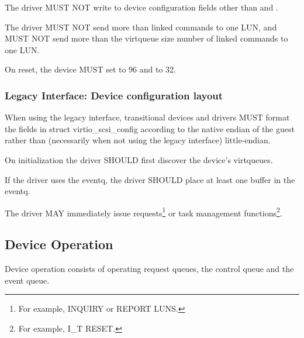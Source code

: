 The driver MUST NOT write to device configuration fields other than
 and .

The driver MUST NOT send more than  linked commands
to one LUN, and MUST NOT send more than the virtqueue size number of
linked commands to one LUN.


On reset, the device MUST set  to 96 and
 to 32.

\subsubsection{Legacy Interface: Device configuration layout}\label{sec:Device Types / SCSI Host Device / Device configuration layout / Legacy Interface: Device configuration layout}
When using the legacy interface, transitional devices and drivers
MUST format the fields in struct virtio_scsi_config
according to the native endian of the guest rather than
(necessarily when not using the legacy interface) little-endian.


On initialization the driver SHOULD first discover the
device's virtqueues.

If the driver uses the eventq, the driver SHOULD place at least one
buffer in the eventq.

The driver MAY immediately issue requests\footnote{For example, INQUIRY
or REPORT LUNS.} or task management functions\footnote{For example, I_T
RESET.}.

\subsection{Device Operation}\label{sec:Device Types / SCSI Host Device / Device Operation}

Device operation consists of operating request queues, the control
queue and the event queue.

